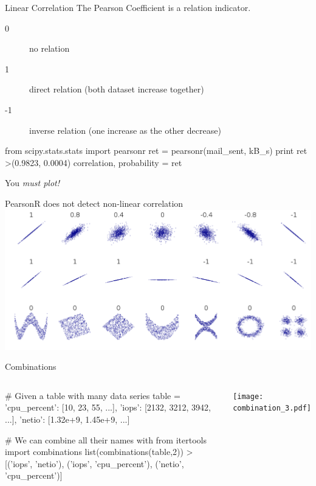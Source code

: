 \begin{frame}[fragile]{Linear Correlation}
The Pearson Coefficient is a relation indicator. 
\begin{description}
\item[0]  no relation
\item[1]  direct relation (both dataset increase together)
\item[-1]  inverse relation (one increase as the other decrease) 
\end{description}

\begin{pythoncode}
from scipy.stats.stats import pearsonr
ret = pearsonr(mail_sent, kB_s)
print ret 
>(0.9823, 0.0004)
correlation, probability = ret
\end{pythoncode}
\end{frame}

\begin{frame}[fragile]{You \emph{must plot!}}
\LARGE
\begin{center}
PearsonR does not detect non-linear correlation \\
\includegraphics[width=.8\textwidth]{correlation.pdf} \\
\end{center}
\end{frame}


\begin{frame}[fragile]{Combinations }
\begin{columns}

\begin{pythoncode}
# Given a table with many data series
table = {'cpu_percent': [10, 23, 55, ...],
        'iops': [2132, 3212, 3942, ...],
        'netio': [1.32e+9, 1.45e+9, ...]}

# We can combine all their names with
from itertools import combinations
list(combinations(table,2))
>[('iops', 'netio'), ('iops', 'cpu_percent'), 
  ('netio', 'cpu_percent')]
\end{pythoncode}
\texttt{[image: combination\_3.pdf]}
\end{columns}
\end{frame}


